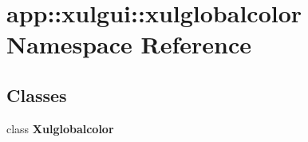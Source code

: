 \section{app::xulgui::xulglobalcolor Namespace Reference}
\label{namespaceapp_1_1xulgui_1_1xulglobalcolor}


\subsection*{Classes}
\begin{CompactItemize}
\item 
class {\bf Xulglobalcolor}
\end{CompactItemize}
